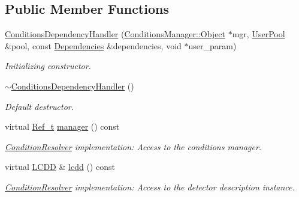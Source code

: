 \subsection*{Public Member Functions}
\begin{DoxyCompactItemize}
\item 
\hyperlink{class_d_d4hep_1_1_conditions_1_1_conditions_dependency_handler_a955647ff8dc9227dc10953d9accf2d62}{Conditions\+Dependency\+Handler} (\hyperlink{class_d_d4hep_1_1_conditions_1_1_conditions_manager_ae865f49d144d8ba5be9eec3e1d8fec94}{Conditions\+Manager\+::\+Object} $\ast$mgr, \hyperlink{class_d_d4hep_1_1_conditions_1_1_user_pool}{User\+Pool} \&pool, const \hyperlink{class_d_d4hep_1_1_conditions_1_1_conditions_dependency_handler_a4a063b30ffccb0e30f3302f1537aef10}{Dependencies} \&dependencies, void $\ast$user\+\_\+param)
\begin{DoxyCompactList}\small\item\em Initializing constructor. \end{DoxyCompactList}\item 
\hyperlink{class_d_d4hep_1_1_conditions_1_1_conditions_dependency_handler_ae67007fc5c43f4ad2092cca1c6247d78}{$\sim$\+Conditions\+Dependency\+Handler} ()
\begin{DoxyCompactList}\small\item\em Default destructor. \end{DoxyCompactList}\item 
virtual \hyperlink{group___d_d4_h_e_p___g_e_o_m_e_t_r_y_ga40af83be6718bb8828a3d83dc7f8c930}{Ref\+\_\+t} \hyperlink{class_d_d4hep_1_1_conditions_1_1_conditions_dependency_handler_ac0fbf5eeea65550355bf386416f7a3b6}{manager} () const
\begin{DoxyCompactList}\small\item\em \hyperlink{class_d_d4hep_1_1_conditions_1_1_condition_resolver}{Condition\+Resolver} implementation\+: Access to the conditions manager. \end{DoxyCompactList}\item 
virtual \hyperlink{class_d_d4hep_1_1_geometry_1_1_l_c_d_d}{L\+C\+DD} \& \hyperlink{class_d_d4hep_1_1_conditions_1_1_conditions_dependency_handler_a75cdb86dde27a5fc974275a5eb7bc786}{lcdd} () const
\begin{DoxyCompactList}\small\item\em \hyperlink{class_d_d4hep_1_1_conditions_1_1_condition_resolver}{Condition\+Resolver} implementation\+: Access to the detector description instance. \end{DoxyCompactList}\item 

\end{DoxyCompactItemize}
